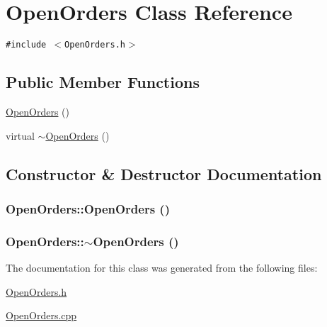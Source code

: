 \hypertarget{class_open_orders}{
\section{Open\-Orders Class Reference}
\label{class_open_orders}
}
{\tt \#include $<$Open\-Orders.h$>$}

\subsection*{Public Member Functions}
\begin{CompactItemize}
\item 
\hyperlink{class_open_orders_fa31ac499620f5ecee101bf9f884c718}{Open\-Orders} ()
\item 
virtual \hyperlink{class_open_orders_8c5068faf090a96858c569077eb4a518}{$\sim$Open\-Orders} ()
\end{CompactItemize}


\subsection{Constructor \& Destructor Documentation}
\hypertarget{class_open_orders_fa31ac499620f5ecee101bf9f884c718}{
\subsubsection[OpenOrders]{\setlength{\rightskip}{0pt plus 5cm}Open\-Orders::Open\-Orders ()}}
\label{class_open_orders_fa31ac499620f5ecee101bf9f884c718}


\hypertarget{class_open_orders_8c5068faf090a96858c569077eb4a518}{
\subsubsection[$\sim$OpenOrders]{\setlength{\rightskip}{0pt plus 5cm}Open\-Orders::$\sim$Open\-Orders ()}}
\label{class_open_orders_8c5068faf090a96858c569077eb4a518}




The documentation for this class was generated from the following files:\begin{CompactItemize}
\item 
\hyperlink{_open_orders_8h}{Open\-Orders.h}\item 
\hyperlink{_open_orders_8cpp}{Open\-Orders.cpp}\end{CompactItemize}
